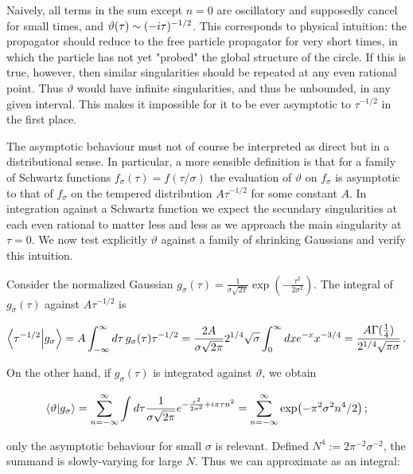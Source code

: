 \documentclass{article}
\newcommand{\T}{\ensuremath{\vartheta}}
\newcommand{\intR}{\int_{-\infty}^\infty}
\newcommand{\sumZ}{\sum_{n=-\infty}^{\infty}}
\begin{document}
Naively, all terms in the sum except $n=0$ are oscillatory and supposedly cancel for small times, and $\vartheta(\tau) \sim (-i\tau)^{-1/2}$. This corresponds to physical intuition: the propagator should reduce to the free particle propagator for very short times, in which the particle has not yet "probed" the global structure of the circle. If this is true, however, then similar singularities should be repeated at any even rational point. Thus $\T$ would have infinite singularities, and thus be unbounded, in any given interval. This makes it impossible for it to be ever asymptotic to $\tau^{-1/2}$ in the first place.

The asymptotic behaviour must not of course be interpreted as direct but in a distributional sense. In particular, a more sensible definition is that for a family of Schwartz functions $f_\sigma(\tau) = f(\tau/\sigma)$ the evaluation of $\vartheta$ on $f_\sigma$ is asymptotic to that of $f_\sigma$ on the tempered distribution $A \tau^{-1/2}$ for some constant $A$. In integration against a Schwartz function we expect the secundary singularities at each even rational to matter less and less as we approach the main singularity at $\tau = 0$. We now test explicitly $\vartheta$ against a family of shrinking Gaussians and verify this intuition.

Consider the normalized Gaussian $g_\sigma(\tau) = \frac{1}{\sigma \sqrt{2\pi}} \exp(-\frac{\tau^2}{2\sigma^2})$. The integral of $g_\sigma(\tau)$ against $A \tau^{-1/2}$ is

\begin{equation*}
    \bra{\tau^{-1/2}}\ket{g_\sigma} =  A \intR d\tau \, g_\sigma(\tau) \tau^{-1/2} = \frac{2A}{\sigma\sqrt{2\pi}} 2^{1/4} \sqrt\sigma \int_0^\infty dx e^{-x} x^{-3/4} = \frac{A\Gamma(\frac{1}{4})}{2^{1/4}\sqrt{\pi\sigma}}\,.
\end{equation*}

On the other hand, if $g_\sigma(\tau)$ is integrated against $\vartheta$, we obtain

\begin{equation*}
    \bra{\vartheta}\ket{g_\sigma} = \sumZ \int d\tau \frac{1}{\sigma \sqrt{2\pi}} e^{-\frac{\tau^2}{2\sigma^2} + i\pi\tau n^2}  = \sumZ \exp(-\pi^2 \sigma^2 n^4 / 2)\,; 
\end{equation*}

only the asymptotic behaviour for small $\sigma$ is relevant. Defined $N^4 := 2 \pi^{-2} \sigma^{-2}$, the summand is slowly-varying for large $N$. Thus we can approximate as an integral:
\end{document}
